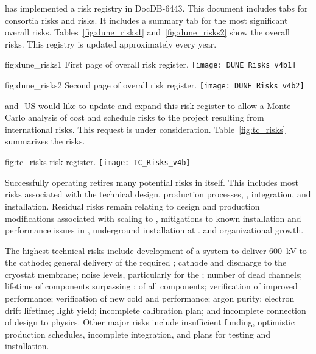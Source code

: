  has implemented a risk registry in
DocDB-6443. This document includes tabs for consortia risks
and  risks. It includes a summary tab for the most significant overall
 risks. Tables~\ref{fig:dune_risks1} and~\ref{fig:dune_risks2} show the overall  risks. This registry
is updated approximately every year.
\begin{dunefigure}{fig:dune_risks1}
  {First page of  overall risk register.}
  \texttt{[image: DUNE\_Risks\_v4b1]}
\end{dunefigure}
\begin{dunefigure}{fig:dune_risks2}
  {Second page of  overall risk register.}
  \texttt{[image: DUNE\_Risks\_v4b2]}
\end{dunefigure}
 and -US would like  to update and
expand this risk register to allow a Monte Carlo analysis of cost and
schedule risks to the  project resulting from international
 risks. This request is under consideration.
Table~\ref{fig:tc_risks} summarizes the  risks.
\begin{dunefigure}{fig:tc_risks}
  { risk register.}
  \texttt{[image: TC\_Risks\_v4b]}
\end{dunefigure}



Successfully operating  retires many
potential risks in  itself. This includes most risks associated with the
technical design, production processes, , integration,
and installation. Residual risks remain relating to design and
production modifications associated with scaling to , mitigations
to known installation and performance issues in , underground
installation at \surf. and organizational growth.

The highest technical risks include development of a system to
deliver \SI{600}{kV} to the \dual cathode; general delivery of the
required ; cathode and  discharge to the cryostat
membrane; noise levels, particularly for the ; %
number of dead channels; lifetime of components surpassing \dunelifetime{}; %
 of all components; verification of improved 
performance; verification of new cold   and   performance;
argon purity; electron drift lifetime; \phel light yield;
incomplete calibration plan; and incomplete connection of design to
physics. Other major risks include insufficient funding, optimistic
production schedules, incomplete integration, and plans for testing and installation.

